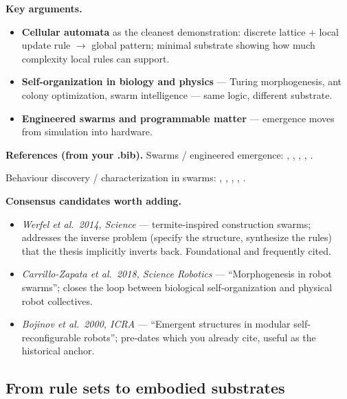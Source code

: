 \textbf{Key arguments.}
\begin{itemize}
    \item \textbf{Cellular automata} as the cleanest demonstration:
          discrete lattice + local update rule $\rightarrow$ global
          pattern; minimal substrate showing how much complexity
          local rules can support.
    \item \textbf{Self-organization in biology and physics} — Turing
          morphogenesis, ant colony optimization, swarm intelligence
          — same logic, different substrate.
    \item \textbf{Engineered swarms and programmable matter} —
          emergence moves from simulation into hardware.
\end{itemize}

\textbf{References (from your .bib).}
Swarms / engineered emergence: \cite{rubensteinProgrammableSelfassemblyThousandrobot2014},
\cite{liParticleRoboticsBased2019},
\cite{cademartiriProgrammableSelfassembly2015},
\cite{bonabeauNaturalArtiCial1999},
\cite{camazineSelfOrganizationBiologicalSystems2001}.

Behaviour discovery / characterization in swarms:
\cite{mattsonDiscoveryDeploymentEmergent2025},
\cite{mattsonLeveragingHumanFeedback2023},
\cite{rajbhandariLearningNEATEmergent2024},
\cite{walkerCharacterizingHumanPerception2016},
\cite{IndirectSwarmControl}.

\textbf{Consensus candidates worth adding.}
\begin{itemize}
    \item \emph{Werfel et al.\ 2014, Science} --- termite-inspired
          construction swarms; addresses the inverse problem
          (specify the structure, synthesize the rules) that the
          thesis implicitly inverts back. Foundational and frequently
          cited.
    \item \emph{Carrillo-Zapata et al.\ 2018, Science Robotics} ---
          ``Morphogenesis in robot swarms''; closes the loop between
          biological self-organization and physical robot collectives.
    \item \emph{Bojinov et al.\ 2000, ICRA} --- ``Emergent structures
          in modular self-reconfigurable robots''; pre-dates
          \cite{kubicaComplexBehaviorsLocal2001} which you already
          cite, useful as the historical anchor.
\end{itemize}

\subsection{From rule sets to embodied substrates}
\label{subsec:rules-to-embodied}

